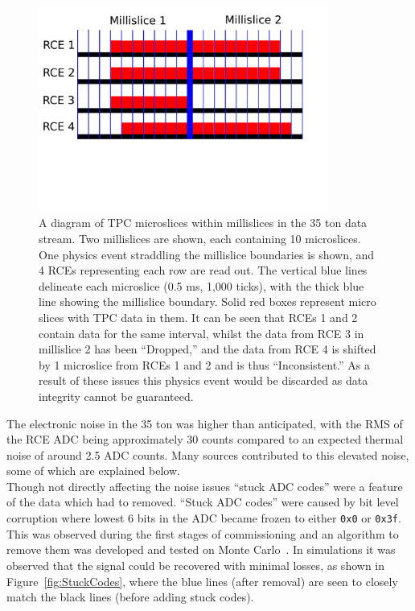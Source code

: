 \begin{figure}[h!]
  \centering
  \includegraphics[width=0.85\textwidth]{DataDrops}
  \caption[Dropped TPC data in the 35 ton]
          {A diagram of TPC microslices within millislices in the 35 ton data stream. Two millislices are shown, each containing 10 microslices. One physics event straddling the millislice boundaries is shown, and 4 RCEs representing each row are read out. The vertical blue lines delineate each microslice (0.5 ms, 1,000 ticks), with the thick blue line showing the millislice boundary. Solid red boxes represent micro slices with TPC data in them. It can be seen that RCEs 1 and 2 contain data for the same interval, whilst the data from RCE 3 in millislice 2 has been ``Dropped,'' and the data from RCE 4 is shifted by 1 microslice from RCEs 1 and 2 and is thus ``Inconsistent.'' As a result of these issues this physics event would be discarded as data integrity cannot be guaranteed.}
  \label{fig:DataDrops}
\end{figure}

The electronic noise in the 35 ton was higher than anticipated, with the RMS of the RCE ADC being approximately 30 counts compared to an expected thermal noise of around 2.5 ADC counts. Many sources contributed to this elevated noise, some of which are explained below. \\

Though not directly affecting the noise issues ``stuck ADC codes'' were a feature of the data which had to removed. ``Stuck ADC codes'' were caused by bit level corruption where lowest 6 bits in the ADC became frozen to either {\tt 0x0} or {\tt 0x3f}. This was observed during the first stages of commissioning and an algorithm to remove them was developed and tested on Monte Carlo~\citep{InslerStuckCode}. In simulations it was observed that the signal could be recovered with minimal losses, as shown in Figure~\ref{fig:StuckCodes}, where the blue lines (after removal) are seen to closely match the black lines (before adding stuck codes). \\


